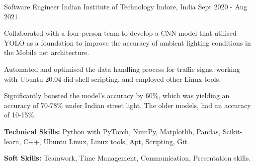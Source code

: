

\begin{cventries}

  \cventry
    {Software Engineer} %
    {Indian Institute of Technology} %
    {Indore, India} %
    {Sept 2020 - Aug 2021} %
    {
      \begin{cvitems} %
        \item {Collaborated with a four-person team to develop a CNN model that utilised YOLO as a foundation to improve the accuracy of ambient lighting conditions in the Mobile net architecture.}
        \item {Automated and optimised the data handling process for traffic signs, working with Ubuntu 20.04 did shell scripting, and employed other Linux tools.}
        \item {Significantly boosted the model's accuracy by 60\%, which was yielding an accuracy of 70-78\% under Indian street light. The older models, had an accuracy of 10-15\%.}
        \item {\textbf{Technical Skills:} Python with PyTorch, NumPy, Matplotlib, Pandas, Scikit-learn, C++, Ubuntu Linux, Linux tools, Apt, Scripting, Git.}
        \item {\textbf{Soft Skills:} Teamwork, Time Management, Communication, Presentation skills.}
      \end{cvitems}
    }

\end{cventries}
